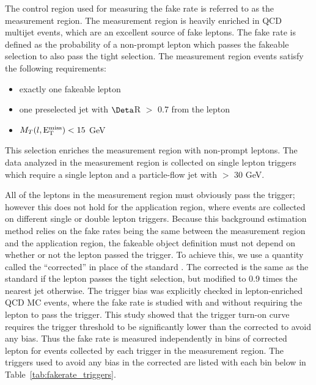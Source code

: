 The control region used for measuring the fake rate is referred to as the measurement region. The measurement region is heavily enriched in QCD multijet events, which are an excellent
source of fake leptons. The fake rate is defined as the probability of a non-prompt lepton which passes the fakeable selection to also pass the tight selection.
The measurement region events satisfy the following requirements:

\begin{itemize}
 \item exactly one fakeable lepton
 \item one preselected jet with $\Deta$R $>$ 0.7 from the lepton
 \item $M_{T}(l,\mathrm{E}^{\mathrm{miss}}_{\mathrm{T}}) < 15$ GeV
\end{itemize}

\noindent This selection enriches the measurement region with non-prompt leptons. The data analyzed in the measurement region is collected on single lepton
triggers which require a single lepton and a particle-flow jet with \pt $>$ 30 GeV.

All of the leptons in the measurement region must obviously pass the trigger; however this does not hold for the application region, where events are collected on different single or double lepton
triggers. Because this background estimation method relies on the fake rates being the same between the measurement region and the application region,
the fakeable object definition must not depend on whether or not the lepton passed the trigger.
To achieve this, we use a quantity called the ``corrected'' \pt in place of the
standard \pt.  The corrected \pt is the same as the standard \pt if the lepton passes the tight selection, but modified to 0.9 times the nearest jet \pt otherwise. 
The trigger bias was explicitly checked in lepton-enriched QCD MC events, 
where the fake rate is studied with and without requiring the lepton to pass the trigger. This study showed that the trigger turn-on curve requires the trigger \pt threshold to be significantly lower than
the corrected \pt to avoid any bias.
Thus the fake rate is measured independently in bins of corrected lepton \pt for events collected by each trigger in the measurement region. The triggers used to avoid any bias in the corrected \pt are listed
with each \pt bin below in Table~\ref{tab:fakerate_triggers}.

